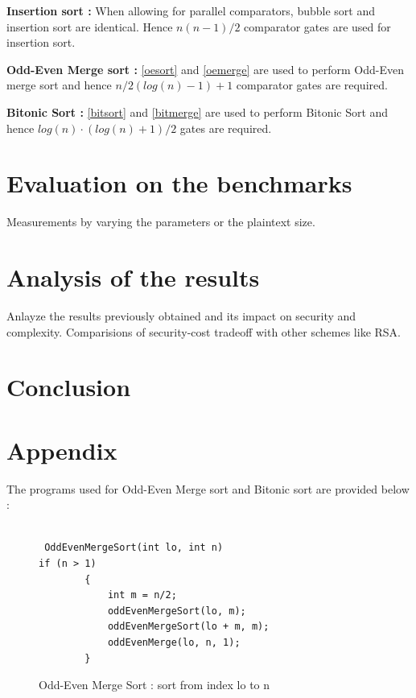 \documentclass{acm_proc_article-sp}
\begin{document}
\textbf{Insertion sort :} When allowing for parallel comparators, bubble sort and insertion sort are identical. Hence $n(n-1)/2$ comparator gates are used for insertion sort.

\textbf{Odd-Even Merge sort :} \autoref{oesort} and \autoref{oemerge} are used to perform Odd-Even merge sort and hence  $n/2(log(n)-1) + 1 $ comparator gates are required. 


\textbf{Bitonic Sort :} \autoref{bitsort} and \autoref{bitmerge} are used to perform Bitonic Sort and hence $log(n) · (log(n)+1) / 2 $ gates are required.


\lstset{                                    %
  language=C,
  frame=lines,
  captionpos=b
 }


\renewcommand{\lstlistingname}{Code}

\section{Evaluation on the benchmarks}
Measurements by varying the parameters or the plaintext size.
\section{Analysis of the results}

Anlayze the results previously obtained and its impact on security and complexity. Comparisions of security-cost tradeoff with other schemes like RSA.
\section{Conclusion}




  

\section{Appendix}

 The programs used for Odd-Even Merge sort and Bitonic sort are provided below : 


\begin{figure}[h]
\begin{lstlisting}[label = oesort ]

 OddEvenMergeSort(int lo, int n)
if (n > 1)
        {
            int m = n/2;
            oddEvenMergeSort(lo, m);
            oddEvenMergeSort(lo + m, m);
            oddEvenMerge(lo, n, 1);
        }

\end{lstlisting}
\caption{Odd-Even Merge Sort : sort from index lo to n }
\end{figure}
\end{document}
